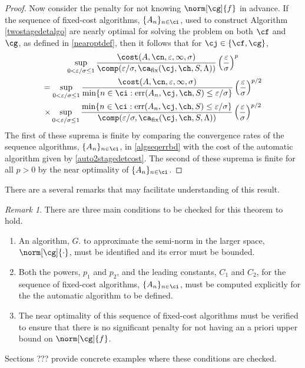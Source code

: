 \documentclass[final]{elsarticle}
\DeclareMathOperator{\err}{err}
\theoremstyle{definition}
\theoremstyle{remark}
\newtheorem{rem}{Remark}
\DeclareMathOperator{\fix}{fix}
\begin{document}
\begin{proof}
Now consider the penalty for not knowing $\norm[\cg]{f}$ in advance.  If the sequence of fixed-cost algorithms, $\{A_n\}_{n \in \ci}$, used to construct Algorithm \ref{twostagedetalgo} are nearly optimal for solving the problem on both $\cf$ and $\cg$, as defined in \eqref{nearoptdef}, then it follows that for $\cj \in \{\cf,\cg\}$,
\begin{multline*}
\sup_{0 < \varepsilon/\sigma \le 1} \frac{\cost(A,\cn,\varepsilon,\infty,\sigma)} {\comp(\varepsilon/\sigma,\ca_{\fix}(\cj,\ch,S,\Lambda))} \left(\frac{\varepsilon}{\sigma}\right)^{p} \\
= \sup_{0 < \varepsilon/\sigma \le 1} \frac{\cost(A,\cn,\varepsilon,\infty,\sigma)}{\min\{n \in \ci : \err(A_n,\cj,\ch,S) \le \varepsilon/\sigma\}} \left(\frac{\varepsilon}{\sigma}\right)^{p/2}  \\
 \times \sup_{0 < \varepsilon/\sigma \le 1} \frac{\min\{n \in \ci : \err(A_n,\cj,\ch,S) \le \varepsilon/\sigma\}} {\comp(\varepsilon/\sigma,\ca_{\fix}(\cj,\ch,S,\Lambda))} \left(\frac{\varepsilon}{\sigma}\right)^{p/2}
\end{multline*} 
The first of these suprema is finite by comparing the convergence rates of the sequence algorithms, $\{A_n\}_{n \in \ci}$, in \eqref{algseqerrbd} with the cost of the automatic algorithm given by \eqref{auto2stagedetcost}. The second of these suprema is finite for all $p>0$ by the near optimality of $\{A_n\}_{n \in \ci}$.  
\end{proof}

There are a several remarks that may facilitate understanding of this result.

\begin{rem} There are three main conditions to be checked for this theorem to hold.
\begin{enumerate}
\renewcommand{\labelenumi}{\roman{enumi}.}
\item An algorithm, $G$. to approximate the semi-norm in the larger space,  $\norm[\cg]{\cdot}$,  must be identified and its error must be bounded.
\item Both the powers, $p_1$ and $p_2$, and the leading constants, $C_1$ and $C_2$, for the sequence of fixed-cost algorithms, $\{A_n\}_{n \in \ci}$, must be computed explicitly for the the automatic algorithm to be defined.
\item The near optimality of this sequence of fixed-cost algorithms must be verified to ensure that there is no significant penalty for not having an a priori upper bound on $\norm[\cg]{f}$.
\end{enumerate}
Sections ??? provide concrete examples where these conditions are checked.
\end{rem}
\end{document}

